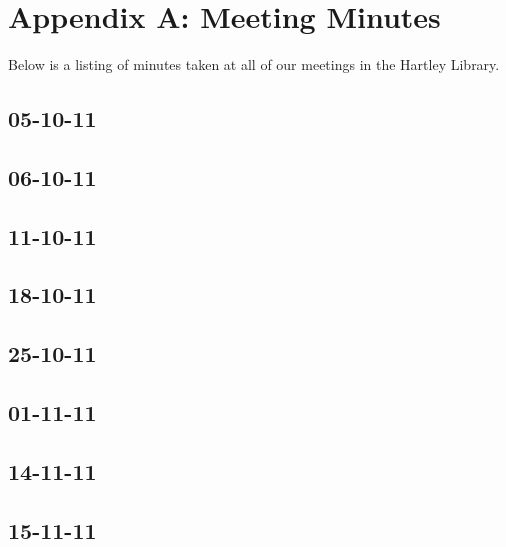 \chapter{Appendix A: Meeting Minutes}

Below is a listing of minutes taken at all of our meetings in the Hartley Library.

\section{05-10-11}

\section{06-10-11}

\section{11-10-11}

\section{18-10-11}

\section{25-10-11}

\section{01-11-11}

\section{14-11-11}

\section{15-11-11}

